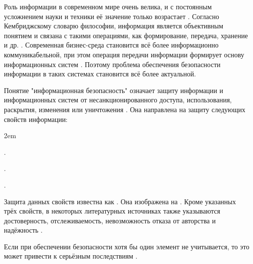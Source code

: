 %
Роль информации в современном мире очень велика, и с постоянным усложнением науки и техники её значение только возрастает .
%
Согласно Кембриджскому словарю философии, информация является объективным понятием и связана с такими операциями, как формирование, передача, хранение и др. .
%
Современная бизнес-среда становится всё более информационно коммуникабельной, при этом операция передачи информации формирует основу информационных систем . 
%
Поэтому проблема обеспечения безопасности информации в таких системах становится всё более актуальной.

%
Понятие "информационная безопасность" означает защиту информации и информационных систем от несанкционированного доступа, использования, раскрытия, изменения или уничтожения 
. 
%
Она направлена на защиту следующих свойств информации:
\begin{description}
	\leftskip2em%
	\setlength{\itemsep}{0pt}%
	\setlength{\parsep}{0pt}%

	\item[Целостность] .

	\item[Конфиденциальность] .

	\item[Доступность] .
\end{description}

%
Защита данных свойств известна как \Emphasis{\CIATriad}.
%
Она изображена на . 
%
Кроме указанных трёх свойств, в некоторых литературных источниках также указываются достоверность, отслеживаемость, невозможность отказа от авторства и надёжность . 


%
Если при обеспечении безопасности хотя бы один элемент \CIATriad не учитывается, то это может привести к серьёзным последствиям .
%
%
%

